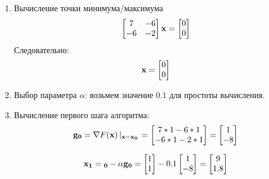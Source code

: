 \documentclass[a4paper]{report}
\begin{document}
\begin{enumerate}
    \item Вычисление точки минимума/максимума
        \begin{eqnarray}
           \left[
                \begin{matrix}
                    7  & -6 \\
                    -6 & -2
                \end{matrix}
           \right]
           {\bf x}=
           \left[
                \begin{matrix}
                0 \\
                0
                \end{matrix}
           \right]
        \end{eqnarray}
    Следовательно:
        \begin{eqnarray}
           {\bf x}=
           \left[
                \begin{matrix}
                0 \\
                0
                \end{matrix}
           \right]
        \end{eqnarray}
    \item Выбор параметра ${\alpha}$: возьмем значение ${0.1}$ для простоты вычисления.

    \item Вычисление первого шага алгоритма:
        \begin{eqnarray}
            {\bf g_0} = \nabla F({\bf x})\left|_{\bf x=x_0}\right. =
            \left[
                \begin{matrix}
                    7*1 - 6*1 \\
                    -6*1 -2*1
                \end{matrix}
            \right]
            =
            \left[
                \begin{matrix}
                    1 \\
                   -8 
                \end{matrix}
            \right]
        \end{eqnarray}

        \begin{eqnarray}
            {\bf x_1} = {\bf _0} - \alpha {\bf g_0} = 
                \left[
                \begin{matrix}
                    1 \\
                    1
                \end{matrix}
                \right]
                - 0.1
                \left[
                \begin{matrix}
                    1 \\
                    -8
                \end{matrix}
                \right]
                =
                \left[
                \begin{matrix}
                    9 \\
                    1.8 
                \end{matrix}
                \right]
        \end{eqnarray}


\end{enumerate}
\end{document}
